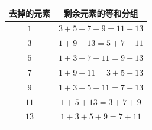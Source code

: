 \documentclass[a4paper,11pt]{article}
\begin{document}
\begin{enumerate}
\begin{center}
\begin{tabular}{|c|c|}
\hline
去掉的元素 & 剩余元素的等和分组 \\
\hline
$1$ & $3+5+7+9=11+13$ \\
$3$ & $1+9+13=5+7+11$ \\
$5$ & $1+3+7+11=9+13$ \\
$7$ & $1+9+11=3+5+13$ \\
$9$ & $1+3+5+11=7+13$ \\
$11$ & $1+5+13=3+7+9$ \\
$13$ & $1+3+5+9=7+11$ \\
\hline
\end{tabular}
\end{center}

\solend
\fi

\end{enumerate}
\end{document}
